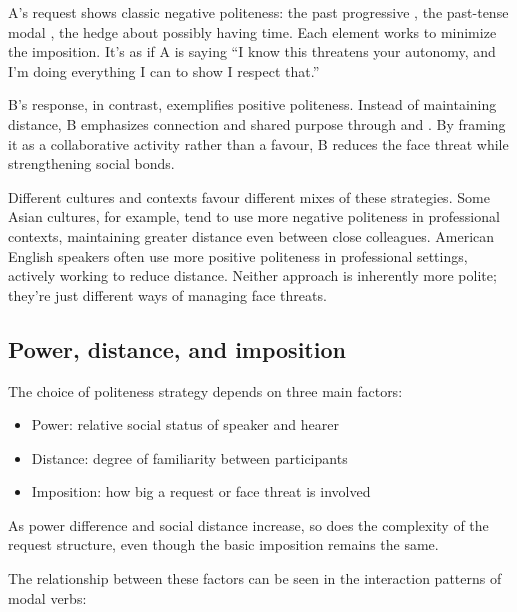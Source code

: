 A's request shows classic negative politeness: the past progressive , the past-tense modal , the hedge about possibly having time. Each element works to minimize the imposition. It's as if A is saying \enquote{I know this threatens your autonomy, and I'm doing everything I can to show I respect that.}

B's response, in contrast, exemplifies positive politeness. Instead of maintaining distance, B emphasizes connection and shared purpose through  and . By framing it as a collaborative activity rather than a favour, B reduces the face threat while strengthening social bonds.

Different cultures and contexts favour different mixes of these strategies. Some Asian cultures, for example, tend to use more negative politeness in professional contexts, maintaining greater distance even between close colleagues. American English speakers often use more positive politeness in professional settings, actively working to reduce distance. Neither approach is inherently more polite; they're just different ways of managing face threats.

\subsection{Power, distance, and imposition}\label{sec:power}

The choice of politeness strategy depends on three main factors:
\begin{itemize}[noitemsep]
    \item Power: relative social status of speaker and hearer
    \item Distance: degree of familiarity between participants
    \item Imposition: how big a request or face threat is involved
\end{itemize}

As power difference and social distance increase, so does the complexity of the request structure, even though the basic imposition remains the same.

The relationship between these factors can be seen in the interaction patterns of modal verbs:
\ea \label{ex:modal-patterns}
    \z
\z

